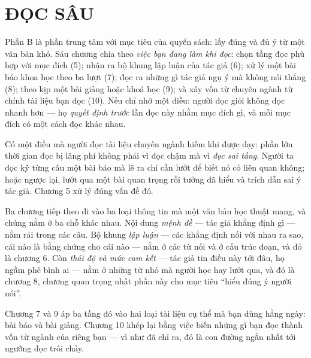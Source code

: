 \documentclass[../english.tex]{subfiles}
\begin{document}
\part{ĐỌC SÂU}
\begin{tomtat}
Phần B là phần trung tâm với mục tiêu của quyển sách: lấy đúng và đủ ý từ một văn bản khó. Sáu chương chia theo \emph{việc bạn đang làm khi đọc}: chọn tầng đọc phù hợp với mục đích (5); nhận ra bộ khung lập luận của tác giả (6); xử lý một bài báo khoa học theo ba lượt (7); đọc ra những gì tác giả ngụ ý mà không nói thẳng (8); theo kịp một bài giảng hoặc khoá học (9); và xây vốn từ chuyên ngành từ chính tài liệu bạn đọc (10). Nếu chỉ nhớ một điều: người đọc giỏi không đọc nhanh hơn --- họ \emph{quyết định trước} lần đọc này nhằm mục đích gì, và mỗi mục đích có một cách đọc khác nhau.
\end{tomtat}

Có một điều mà người đọc tài liệu chuyên ngành hiếm khi được dạy: phần lớn thời gian đọc bị lãng phí không phải vì đọc chậm mà vì \emph{đọc sai tầng}. Người ta đọc kỹ từng câu một bài báo mà lẽ ra chỉ cần lướt để biết nó có liên quan không; hoặc ngược lại, lướt qua một bài quan trọng rồi tưởng đã hiểu và trích dẫn sai ý tác giả. Chương 5 xử lý đúng vấn đề đó.

Ba chương tiếp theo đi vào ba loại thông tin mà một văn bản học thuật mang, và chúng nằm ở ba chỗ khác nhau. Nội dung \emph{mệnh đề} --- tác giả khẳng định gì --- nằm rải trong các câu. Bộ khung \emph{lập luận} --- các khẳng định nối với nhau ra sao, cái nào là bằng chứng cho cái nào --- nằm ở các từ nối và ở cấu trúc đoạn, và đó là chương 6. Còn \emph{thái độ và mức cam kết} --- tác giả tin điều này tới đâu, họ ngầm phê bình ai --- nằm ở những từ nhỏ mà người học hay lướt qua, và đó là chương 8, chương quan trọng nhất phần này cho mục tiêu ``hiểu đúng ý người nói''.

Chương 7 và 9 áp ba tầng đó vào hai loại tài liệu cụ thể mà bạn dùng hằng ngày: bài báo và bài giảng. Chương 10 khép lại bằng việc biến những gì bạn đọc thành vốn từ ngành của riêng bạn --- vì như  đã chỉ ra, đó là con đường ngắn nhất tới ngưỡng đọc trôi chảy.







\ifSubfilesClassLoaded{\printbibliography[title={Nguồn}]}{}
\end{document}
